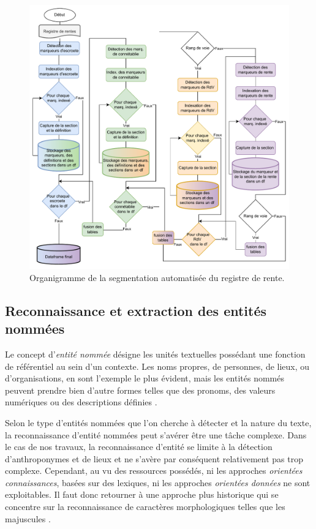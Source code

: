 \begin{figure}[ht] %
    \centering
    \includegraphics[scale=0.75]{2.Methods/Img/seg.drawio.pdf} 
    \caption{Organigramme de la segmentation automatisée du registre de rente.}
\end{figure}


\subsection{Reconnaissance et extraction des entités nommées}

Le concept d'\textit{entité nommée} désigne les unités textuelles possédant une fonction de référentiel au sein d'un contexte. Les noms propres, de personnes, de lieux, ou d'organisations, en sont l'exemple le plus évident, mais les entités nommés peuvent prendre bien d'autre formes telles que des pronoms, des valeurs numériques ou des descriptions définies \parencite{omrane_les_2010,nadeau_survey_2007}.

Selon le type d'entités nommées que l'on cherche à détecter et la nature du texte, la reconnaissance d'entité nommées peut s'avérer être une tâche complexe. Dans le cas de nos travaux, la reconnaissance d'entité se limite à la détection d'anthroponymes et de lieux et ne s'avère par conséquent relativement pas trop complexe. Cependant, au vu des ressources possédés, ni les approches \textit{orientées connaissances}, basées sur des lexiques, ni les approches \textit{orientées données} ne sont exploitables. Il faut donc retourner à une  approche plus historique qui se concentre sur la reconnaissance de caractères morphologiques telles que les majuscules \parencite{nouvel_reconnaissance_2012}. 

